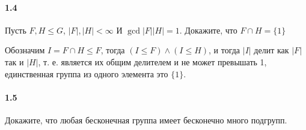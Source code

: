 \documentclass[a4paper,12pt]{article}
\begin{document}
\paragraph{1.4} Пусть $F,H \le G$, $\left|F\right|,\left|H\right| < \infty$ И $\gcd{\left|F\right|}{\left|H\right|} = 1$. Докажите, что $F \cap H = \{1\}$

\begin{Proof}
Обозначим $I = F \cap H \le F$, тогда $\left(I \le F\right) \land \left(I \le H\right)$, и тогда $\left|I\right|$ делит как $\left|F\right|$ так и $\left|H\right|$, т. е. является их общим делителем и не может превышать 1, единственная группа из одного элемента это $\{1\}$.
\end{Proof}

\paragraph{1.5} Докажите, что любая бесконечная группа имеет бесконечно много подгрупп.

\begin{Proof}

\end{Proof}
\end{document}
